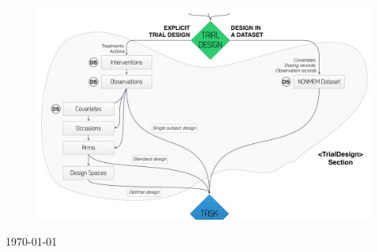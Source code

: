 \begin{titlepage}
\begin{center}
\vfill
\begin{figure}[htb]
\centering
  \includegraphics[width=140mm]{pics/Flowchart_designPart}
\end{figure}



\vfill

{\large \today \\}

\end{center}
\end{titlepage}